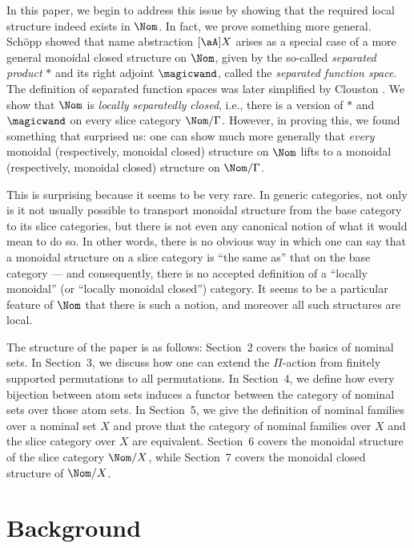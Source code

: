 \documentclass[twoside,11pt]{entics}
\begin{document}
In this paper, we begin to address this issue by showing that the
required local structure indeed exists in $\Nom$. In fact, we prove
something more general. Sch\"opp {\cite{Schopp2006}} showed that name
abstraction $[\aA]X$ arises as a special case of a more general
monoidal closed structure on $\Nom$, given by the so-called
\emph{separated product} $\ast$ and its right adjoint $\magicwand$,
called the \emph{separated function space}. The definition of
separated function spaces was later simplified by Clouston
{\cite{Clouston2013}}. We show that $\Nom$ is \emph{locally
  separatedly closed}, i.e., there is a version of $\ast$ and
$\magicwand$ on every slice category $\Nom/\Gamma$.  However, in
proving this, we found something that surprised us: one can
show much more generally that \emph{every} monoidal (respectively,
monoidal closed) structure on $\Nom$ lifts to a monoidal
(respectively, monoidal closed) structure on $\Nom/\Gamma$.

This is surprising because it seems to be very rare. In generic
categories, not only is it not usually possible to transport monoidal
structure from the base category to its slice categories, but there is
not even any canonical notion of what it would mean to do so. In other
words, there is no obvious way in which one can say that a monoidal
structure on a slice category is ``the same as'' that on the base
category --- and consequently, there is no accepted definition of a
``locally monoidal'' (or ``locally monoidal closed'') category.
It seems to be a particular feature of $\Nom$ that there is such a
notion, and moreover all such structures are local.

The structure of the paper is as follows: Section~2 covers the basics
of nominal sets. In Section~3, we discuss how one can extend the
$\Pi$-action from finitely supported permutations to all
permutations. In Section~4, we define how every bijection between atom
sets induces a functor between the category of nominal sets over those
atom sets.  In Section~5, we give the definition of nominal families
over a nominal set $X$ and prove that the category of nominal families
over $X$ and the slice category over $X$ are equivalent. Section~6
covers the monoidal structure of the slice category $\Nom/X$, while
Section~7 covers the monoidal closed structure of $\Nom/X$.

\section{Background}
\end{document}
